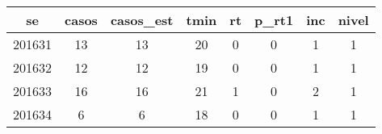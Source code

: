 \begin{tabular}{c|ccccccc}
  \hline
se & casos & casos\_est & tmin & rt & p\_rt1 & inc & nivel \\ 
  \hline
201631 & 13 & 13 & 20 & 0 & 0 & 1 & 1 \\ 
  201632 & 12 & 12 & 19 & 0 & 0 & 1 & 1 \\ 
  201633 & 16 & 16 & 21 & 1 & 0 & 2 & 1 \\ 
  201634 & 6 & 6 & 18 & 0 & 0 & 1 & 1 \\ 
   \hline
\end{tabular}
